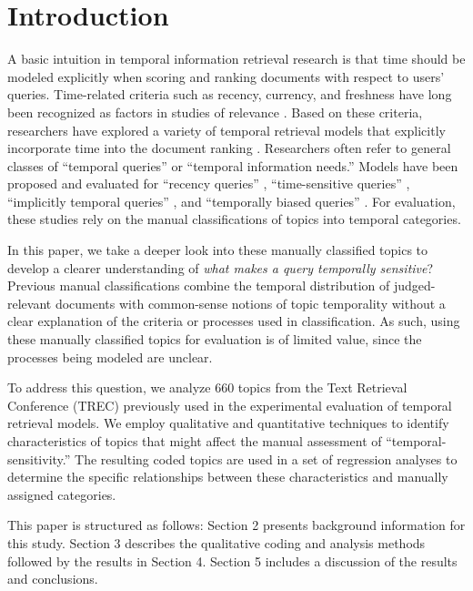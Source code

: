 \documentclass[runningheads,a4paper]{llncs}
\begin{document}
\section{Introduction}

A basic intuition in temporal information retrieval research is that time should be modeled explicitly when scoring and ranking documents with respect to users' queries. Time-related criteria such as recency, currency, and freshness have long been recognized as factors in studies of relevance \cite{Barry1998}. Based on these criteria, researchers have explored a variety of temporal retrieval models that explicitly incorporate time into the document ranking \cite{Li2003,Efron2011,Dakka2012}. Researchers often refer to general classes of ``temporal queries'' or ``temporal information needs.''  Models have been proposed and evaluated for ``recency queries'' \cite{Li2003,Efron2011}, ``time-sensitive queries'' \cite{Dakka2012}, ``implicitly temporal queries'' \cite{Metzler2009}, and ``temporally biased queries'' \cite{Jones2007}.  For evaluation,  these studies rely on the manual classifications of topics into temporal categories.

In this paper, we take a deeper look into these manually classified topics to develop a clearer understanding of \emph{what makes a query temporally sensitive}?  Previous manual classifications combine the temporal distribution of judged-relevant documents with common-sense notions of topic temporality without a clear explanation of the criteria or processes used in classification. As such, using these manually classified topics for evaluation is of limited value, since the processes being modeled are unclear. 

To address this question, we analyze  660 topics from the Text Retrieval Conference (TREC) previously used in the experimental evaluation of temporal retrieval models. We employ qualitative and quantitative techniques to identify characteristics of topics that might affect the manual assessment of ``temporal-sensitivity.'' The resulting coded topics are used in a set of regression analyses to determine the specific relationships between these characteristics and manually assigned categories. 

This paper is structured as follows: Section 2 presents background information for this study. Section 3 describes the qualitative coding and analysis methods followed by the results in Section 4. Section 5 includes a discussion of the results and conclusions.
\end{document}
